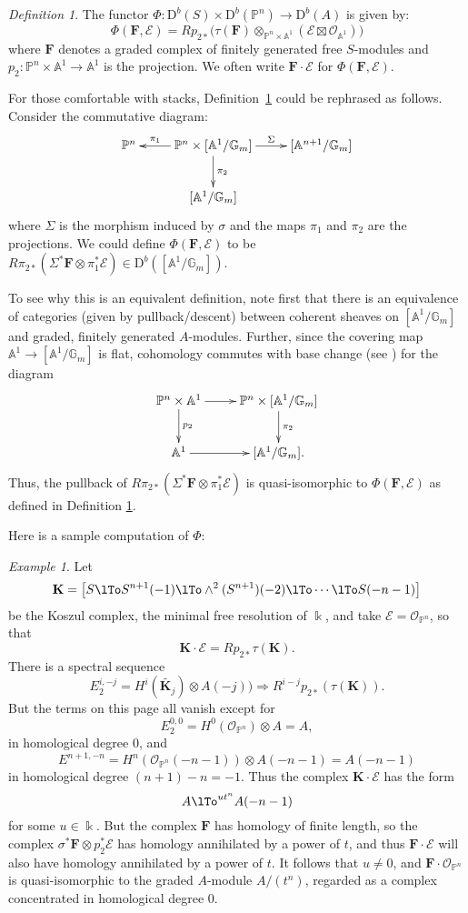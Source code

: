 \documentclass[12pt]{amsart}
\theoremstyle{definition}
\theoremstyle{remark}
\newtheorem{defn}[lemma]{Definition}
\newtheorem{example}[lemma]{Example}
\newcommand{\Spec}{\operatorname{Spec}}
\newcommand{\kk}{\Bbbk}
\newcommand{\PP}{\mathbb{P}}
\renewcommand{\AA}{\mathbb{A}}
\newcommand{\GG}{\mathbb{G}}
\newcommand{\cO}{\mathcal{O}}
\newcommand{\cE}{\mathcal{E}}
\newcommand{\bK}{\mathbf{K}}
\newcommand{\FF}{\mathbf{F}}
\newcommand{\DD}{\mathrm{D}}
\renewcommand{\P}{{\mathbb P}}
\begin{document}
\begin{defn} \label{defn:product} The functor $\Phi: \DD^{b}(S)\times \DD^b(\PP^n) \to \DD^{b}(A)$ is given by:
$$
\Phi(\FF,\cE) = Rp_{2*} \bigl(\tau(\FF)\otimes_{\P^{n}\times\AA^{1}} (\cE\boxtimes \cO_{\AA^{1}}) \bigr)
$$
where $\FF$ denotes a graded  complex of finitely generated free $S$-modules and
$p_2: \PP^{n}\times \AA^{1}\to \AA^{1}$ is the projection. We  often write
$\FF\cdot \cE$ for $\Phi(\FF,\cE)$.
\end{defn}

For those comfortable with stacks, Definition~\ref{defn:product}
could be rephrased as follows. Consider the commutative diagram:
\[
\xymatrix{
\PP^n&\PP^{n}\times [\AA^1/\GG_m]\ar[l]_-{\pi_{1}} \ar[r]^-{\Sigma} \ar[d]^{\pi_2}&[\AA^{n+1}/\GG_m]\\
&[\AA^1/\GG_m]&%
}
\]
where $\Sigma$ is the morphism induced by $\sigma$ and the maps $\pi_1$ and $\pi_2$ are the projections.  We could define $\Phi(\FF,\cE)$ to be $R\pi_{2*}\left( \Sigma^*\FF\otimes \pi_{1}^{*}\cE\right)\in \DD^b([\AA^1/\GG_m])$.

To see why this is an equivalent definition, note first  that there is an equivalence of categories (given by pullback/descent) between coherent sheaves on $[\AA^1/\GG_m]$ and graded, finitely generated $A$-modules. Further, since the covering map $\AA^1\to [\AA^1/\GG_m]$ is flat, cohomology commutes with base change (see \cite[0765]{stacks-project}) for the diagram
\[
\xymatrix{
\PP^n\times \AA^1\ar[r]\ar[d]^-{p_2}&\PP^{n}\times [\AA^1/\GG_m]\ar[d]^{\pi_2}\\
\AA^1\ar[r]&[\AA^1/\GG_m].
}
\]
Thus, the pullback of $R\pi_{2*}\left( \Sigma^*\FF\otimes \pi_{1}^{*}\cE\right)$ is quasi-isomorphic 
to $\Phi(\FF,\cE)$ as defined in Definition \ref{defn:product}.

Here is a sample computation of $\Phi$: 

\begin{example} Let 
$$
\bK = \bigl[ S\lTo S^{n+1}(-1) \lTo \wedge^{2}(S^{n+1})(-2) \lTo\cdots\lTo S(-n-1)\bigr]
$$
be the Koszul complex, the minimal free resolution of $\kk$, and take
$\cE = \cO_{\PP^{n}}$, so that 
$$
\bK \cdot \cE = Rp_{2*}\tau(\bK).$$  
There is a spectral sequence
\[
E_2^{i,-j}=H^i(\widetilde{\bK_j})\otimes A(-j))\Rightarrow R^{i-j}p_{2*}(\tau(\bK)).
\]
But 
the terms on this page all vanish except for
$$
E^{0,0}_2= H^{0}(\cO_{\PP^{n}})\otimes A = A,
$$
in homological degree 0, and 
$$
E^{n+1,-n}=H^{n}(\cO_{\PP^{n}}(-n-1)) \otimes  A(-n-1) = A(-n-1)
$$
in homological degree $(n+1)-n = -1$.
Thus the complex $\bK \cdot \cE$ has the form
$$
A\lTo^{ut^{n}}A(-n-1)
$$
for some $u\in \kk$. But the complex $\FF$ has homology of finite length, so the complex $\sigma^{*}\FF \otimes p_{2}^{*}\cE$ has homology annihilated by a power of $t$, and thus $\FF\cdot \cE$ will also have homology annihilated by a power of $t$. It follows that $u\neq 0$, and $\FF\cdot \cO_{\PP^{n}}$ is quasi-isomorphic to the graded $A$-module $A/(t^{n})$, regarded as a complex concentrated in homological degree 0.
\end{example}
\end{document}
